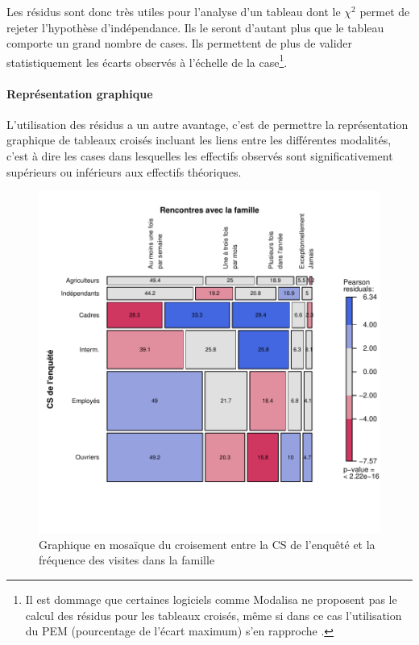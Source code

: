 \documentclass[a4paper,10pt,twoside,francais]{report}
\renewcommand{\cite}{\citep}
\newcommand{\chid}{$\chi^2$\xspace}
\begin{document}
Les résidus sont donc très utiles pour l'analyse d'un tableau dont
le \chid permet de rejeter l'hypothèse d'indépendance. Ils le seront
d'autant plus que le tableau comporte un grand nombre de cases. Ils
permettent de plus de valider statistiquement les écarts observés à
l'échelle de la case\footnote{Il est dommage que certaines logiciels
  comme \textsf{Modalisa} ne proposent pas le calcul des résidus pour
  les tableaux croisés, même si dans ce cas l'utilisation du PEM
  (pourcentage de l'écart maximum) s'en rapproche
  \cite{Cibois1993pem}.}. 


\paragraph{Représentation graphique}

L'utilisation des résidus a un autre avantage, c'est de permettre la
représentation graphique de tableaux croisés incluant les liens entre
les différentes modalités, c'est à dire les cases dans lesquelles les
effectifs observés sont significativement supérieurs ou inférieurs aux
effectifs théoriques.

\begin{figure}
  \begin{center}
    \includegraphics[width=15cm]{images/mosaic.pdf}
  \end{center}
  \caption{Graphique en mosaïque du croisement entre la CS de
    l'enquêté et la fréquence des visites dans la famille}
  \label{fig_mosaic}
\end{figure}
\end{document}
